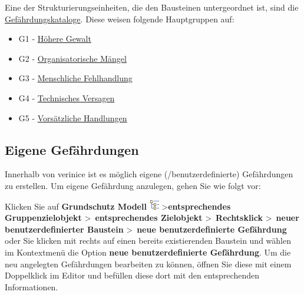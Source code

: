 \documentclass[a4paper,10pt]{book}
\begin{document}
Eine der Strukturierungseinheiten, die den Bausteinen untergeordnet ist, sind die \href{https://www.bsi.bund.de/cln_156/DE/Themen/weitereThemen/ITGrundschutzKataloge/Inhalt/Gefaehrdungskataloge/gefaehrdungskataloge_node.html}{Gefährdungskataloge}. Diese weisen folgende Hauptgruppen auf:
\begin{itemize}
\item G1 - \href{https://www.bsi.bund.de/cln_156/DE/Themen/weitereThemen/ITGrundschutzKataloge/Inhalt/Gefaehrdungskataloge/G1HoehereGewalt/g1hoeheregewalt_node.html}{Höhere Gewalt}
\item G2 - \href{https://www.bsi.bund.de/cln_156/DE/Themen/weitereThemen/ITGrundschutzKataloge/Inhalt/Gefaehrdungskataloge/G2OrganisatorischeMaengel/g2organisatorischemaengel_node.html}{Organisatorische Mängel}
\item G3 - \href{https://www.bsi.bund.de/cln_156/DE/Themen/weitereThemen/ITGrundschutzKataloge/Inhalt/Gefaehrdungskataloge/G3MenschlicheFehlhandlung/g3menschlichefehlhandlung_node.html}{Menschliche Fehlhandlung}
\item G4 - \href{https://www.bsi.bund.de/cln_156/DE/Themen/weitereThemen/ITGrundschutzKataloge/Inhalt/Gefaehrdungskataloge/G4TechnischesVersagen/g4technischesversagen_node.html}{Technisches Versagen}
\item G5 - \href{https://www.bsi.bund.de/cln_156/DE/Themen/weitereThemen/ITGrundschutzKataloge/Inhalt/Gefaehrdungskataloge/G5VorsaetzlicheHandlungen/g5vorsaetzlichehandlungen_node.html}{Vorsätzliche Handlungen}
\end{itemize}

\subsection{Eigene Gefährdungen}
\label{sec_eigene_gefaehrdung}
Innerhalb von verinice ist es möglich eigene (/benutzerdefinierte) Gefährdungen zu erstellen. Um eigene Gefährdung anzulegen, gehen Sie wie folgt vor:

Klicken Sie auf \textbf{Grundschutz Modell} \includegraphics[height=2ex]{Icon/GS_Modell.png} \textgreater \textbf{entsprechendes Gruppenzielobjekt}
\textgreater\ \textbf{entsprechendes Zielobjekt} \textgreater\ \textbf{Rechtsklick} \textgreater\ \textbf{neuer benutzerdefinierter Baustein} \textgreater\
\textbf{neue benutzerdefinierte Gefährdung} oder Sie klicken mit rechts auf einen bereits existierenden Baustein und wählen im Kontextmenü
die Option \textbf{neue benutzerdefinierte Gefährdung}.
Um die neu angelegten Gefährdungen bearbeiten zu können, öffnen Sie diese mit einem Doppelklick im Editor und befüllen diese dort mit den entsprechenden
Informationen.
\end{document}

